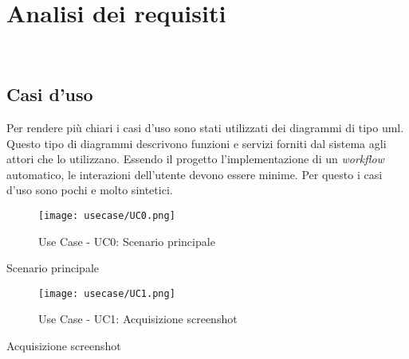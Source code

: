 \chapter{Analisi dei requisiti}
\label{cap:analisi-requisiti}

\\

\section{Casi d'uso}
Per rendere più chiari i casi d'uso sono stati utilizzati dei diagrammi di tipo \gls{uml}.
Questo tipo di diagrammi descrivono funzioni e servizi forniti dal sistema agli attori che lo utilizzano.
Essendo il progetto l'implementazione di un \emph{workflow} automatico, le interazioni dell'utente devono essere minime.
Per questo i casi d'uso sono pochi e molto sintetici.

\begin{figure}[!h] 
    \centering 
    \texttt{[image: usecase/UC0.png]} 
    \caption{Use Case - UC0: Scenario principale}
\end{figure}

\begin{usecase}{0}{Scenario principale}
    \label{uc:scenario-principale}
\end{usecase}

\begin{figure}[!h] 
    \centering 
    \texttt{[image: usecase/UC1.png]} 
    \caption{Use Case - UC1: Acquisizione screenshot}
\end{figure}

\begin{usecase}{1}{Acquisizione screenshot} 
    \label{uc:acquisizione-screenshot} 
\end{usecase}
 
